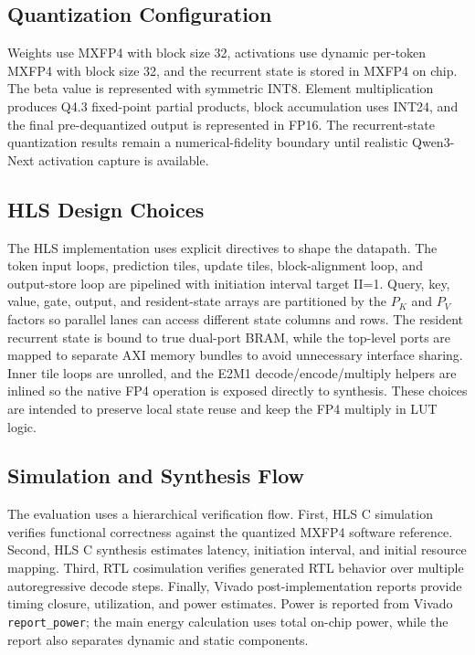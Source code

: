 \documentclass[conference]{IEEEtran}
\begin{document}
\subsection{Quantization Configuration}
Weights use MXFP4 with block size 32, activations use dynamic per-token MXFP4 with block size 32, and the recurrent state is stored in MXFP4 on chip. The beta value is represented with symmetric INT8. Element multiplication produces Q4.3 fixed-point partial products, block accumulation uses INT24, and the final pre-dequantized output is represented in FP16. The recurrent-state quantization results remain a numerical-fidelity boundary until realistic Qwen3-Next activation capture is available.

\subsection{HLS Design Choices}
The HLS implementation uses explicit directives to shape the datapath. The token input loops, prediction tiles, update tiles, block-alignment loop, and output-store loop are pipelined with initiation interval target II=1. Query, key, value, gate, output, and resident-state arrays are partitioned by the $P_K$ and $P_V$ factors so parallel lanes can access different state columns and rows. The resident recurrent state is bound to true dual-port BRAM, while the top-level ports are mapped to separate AXI memory bundles to avoid unnecessary interface sharing. Inner tile loops are unrolled, and the E2M1 decode/encode/multiply helpers are inlined so the native FP4 operation is exposed directly to synthesis. These choices are intended to preserve local state reuse and keep the FP4 multiply in LUT logic.

\subsection{Simulation and Synthesis Flow}
The evaluation uses a hierarchical verification flow. First, HLS C simulation verifies functional correctness against the quantized MXFP4 software reference. Second, HLS C synthesis estimates latency, initiation interval, and initial resource mapping. Third, RTL cosimulation verifies generated RTL behavior over multiple autoregressive decode steps. Finally, Vivado post-implementation reports provide timing closure, utilization, and power estimates. Power is reported from Vivado \texttt{report\_power}; the main energy calculation uses total on-chip power, while the report also separates dynamic and static components.
\end{document}
